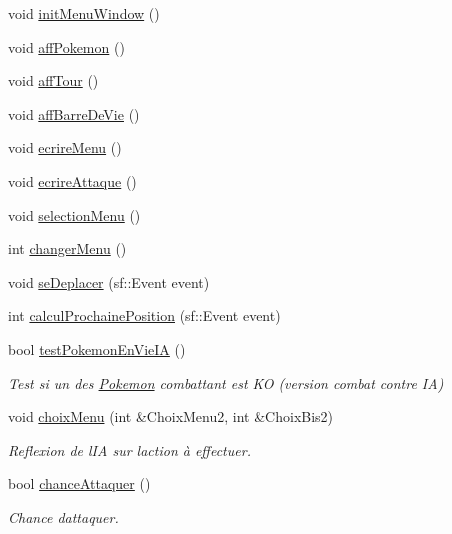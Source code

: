 \begin{DoxyCompactItemize}
\item 
void \hyperlink{class_s_f_m_l_combat_aba0eacdc425cc859b8533060ead79564}{init\+Menu\+Window} ()
\item 
void \hyperlink{class_s_f_m_l_combat_ab5de8e3048e2549352cea43a3ff636d4}{aff\+Pokemon} ()
\item 
void \hyperlink{class_s_f_m_l_combat_ae641a09e3a5a8e50b3fe8352207e4748}{aff\+Tour} ()
\item 
void \hyperlink{class_s_f_m_l_combat_ad5ab6d579c0da644135ae1e51e44f890}{aff\+Barre\+De\+Vie} ()
\item 
void \hyperlink{class_s_f_m_l_combat_a557bb97c785650b8d28ff913ca86081a}{ecrire\+Menu} ()
\item 
void \hyperlink{class_s_f_m_l_combat_a83899ae7d061225976857060d2a16388}{ecrire\+Attaque} ()
\item 
void \hyperlink{class_s_f_m_l_combat_a9a9295e8e7f369f0443ee5618004f0d9}{selection\+Menu} ()
\item 
int \hyperlink{class_s_f_m_l_combat_ab856672c59db95d55c7c28cd3a1eee93}{changer\+Menu} ()
\item 
void \hyperlink{class_s_f_m_l_combat_a796b43eec3296bc9d66e2618069f5abe}{se\+Deplacer} (sf\+::\+Event event)
\item 
int \hyperlink{class_s_f_m_l_combat_a2e7feee45aae418d7545cc71534e6148}{calcul\+Prochaine\+Position} (sf\+::\+Event event)
\item 
bool \hyperlink{class_s_f_m_l_combat_a97bf8a2d3300663aacbb8899bbbf3472}{test\+Pokemon\+En\+Vie\+IA} ()
\begin{DoxyCompactList}\small\item\em Test si un des \hyperlink{class_pokemon}{Pokemon} combattant est KO (version combat contre IA) \end{DoxyCompactList}\item 
void \hyperlink{class_s_f_m_l_combat_ad72f480db9eb3f134e3736b1acb228c8}{choix\+Menu} (int \&Choix\+Menu2, int \&Choix\+Bis2)
\begin{DoxyCompactList}\small\item\em Reflexion de l\textquotesingle{}IA sur l\textquotesingle{}action à effectuer. \end{DoxyCompactList}\item 
bool \hyperlink{class_s_f_m_l_combat_ac8720bfe637fdaa932ef45240493bbd6}{chance\+Attaquer} ()
\begin{DoxyCompactList}\small\item\em Chance d\textquotesingle{}attaquer. \end{DoxyCompactList}\item 

\end{DoxyCompactItemize}

